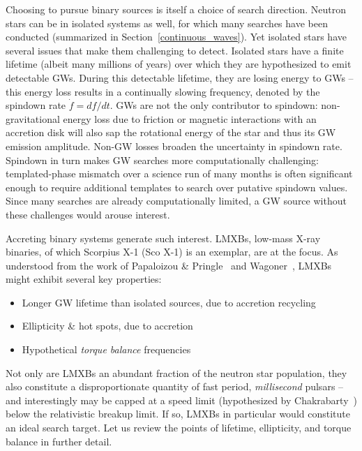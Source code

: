 
Choosing to pursue binary sources is itself a choice of search direction.
Neutron stars can be in isolated systems as well, for which many searches have been conducted (summarized in Section~\ref{continuous_waves}).
Yet isolated stars have several issues that make them challenging to detect.
Isolated stars have a finite lifetime (albeit many millions of years) over which they are hypothesized to emit detectable GWs.
During this detectable lifetime, they are losing energy to GWs -- this energy loss results in a continually slowing frequency, denoted by the spindown rate $\dot{f} = df /dt$.
GWs are not the only contributor to spindown: non-gravitational energy loss due to friction or magnetic interactions with an accretion disk will also sap the rotational energy of the star and thus its GW emission amplitude.
Non-GW losses broaden the uncertainty in spindown rate.
Spindown in turn makes GW searches more computationally challenging: templated-phase mismatch over a science run of many months is often significant enough to require additional templates to search over putative spindown values. 
Since many searches are already computationally limited, a GW source without these challenges would arouse interest.

Accreting binary systems generate such interest.
LMXBs, low-mass X-ray binaries, of which Scorpius X-1 (Sco X-1) is an exemplar, are at the focus.
As understood from the work of Papaloizou \& Pringle~\cite{PapaloizouPringle1978} and Wagoner~\cite{Wagoner1984}, LMXBs might exhibit several key properties:

\begin{itemize}
\item Longer GW lifetime than isolated sources, due to accretion recycling
\item Ellipticity \& hot spots, due to accretion
\item Hypothetical \textit{torque balance} frequencies
\end{itemize}

Not only are LMXBs an abundant fraction of the neutron star population, they also constitute a disproportionate quantity of fast period, \textit{millisecond} pulsars -- and interestingly may be capped at a speed limit (hypothesized by Chakrabarty~\cite{Chakrabarty2003}) below the relativistic breakup limit.
If so, LMXBs in particular would constitute an ideal search target.
Let us review the points of lifetime, ellipticity, and torque balance in further detail.

